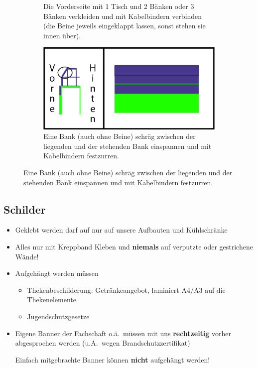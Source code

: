 \begin{figure}[h]
\begin{subfigure}[t]{0.45\textwidth}
    \caption{Die Vorderseite mit 1 Tisch und 2 Bänken oder 3 Bänken verkleiden und mit Kabelbindern verbinden (die Beine jeweils eingeklappt lassen, sonst stehen sie innen über).}
  \end{subfigure}
  \hfill
  \begin{subfigure}[t]{0.45\textwidth}
    \includegraphics[width=\textwidth]{2d_4.png}
    \caption{Eine Bank (auch ohne Beine) schräg zwischen der liegenden und der stehenden Bank einspannen und mit Kabelbindern festzurren.}
  \end{subfigure}
\end{figure}
\subsection{Schilder}
\begin{itemize}
  \item Geklebt werden darf auf nur auf unsere Aufbauten und Kühlschränke
  \item Alles nur mit Kreppband Kleben und \textbf{niemals} auf verputzte oder gestrichene Wände!
  \item Aufgehängt werden müssen
    \begin{itemize}
      \item Thekenbeschilderung: Getränkeangebot, laminiert A4/A3 auf die Thekenelemente
      \item Jugendschutzgesetze
    \end{itemize}
  \item Eigene Banner der Fachschaft o.ä.\ müssen mit uns \textbf{rechtzeitig} vorher abgesprochen werden (u.A.\ wegen Brandschutzzertifikat)

    Einfach mitgebrachte Banner können \textbf{nicht} aufgehängt werden!
\end{itemize}

